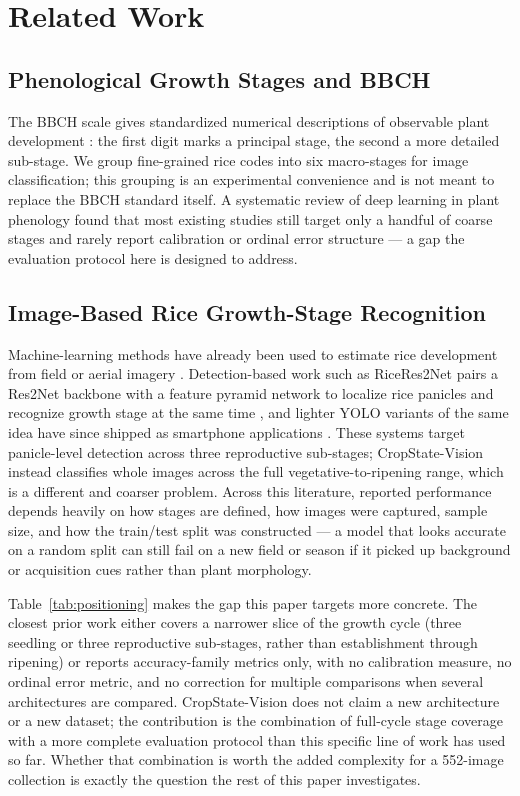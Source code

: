 \documentclass{llncs}
\begin{document}
\section{Related Work}

\subsection{Phenological Growth Stages and BBCH}

The BBCH scale gives standardized numerical descriptions of observable plant development \cite{meier2001bbch,lancashire1991uniform}: the first digit marks a principal stage, the second a more detailed sub-stage. We group fine-grained rice codes into six macro-stages for image classification; this grouping is an experimental convenience and is not meant to replace the BBCH standard itself. A systematic review of deep learning in plant phenology found that most existing studies still target only a handful of coarse stages and rarely report calibration or ordinal error structure \cite{katal2022deep} — a gap the evaluation protocol here is designed to address.

\subsection{Image-Based Rice Growth-Stage Recognition}

Machine-learning methods have already been used to estimate rice development from field or aerial imagery \cite{tan2022machine}. Detection-based work such as RiceRes2Net pairs a Res2Net backbone with a feature pyramid network to localize rice panicles and recognize growth stage at the same time \cite{tan2023ricepanicle}, and lighter YOLO variants of the same idea have since shipped as smartphone applications \cite{zheng2025android}. These systems target panicle-level detection across three reproductive sub-stages; CropState-Vision instead classifies whole images across the full vegetative-to-ripening range, which is a different and coarser problem. Across this literature, reported performance depends heavily on how stages are defined, how images were captured, sample size, and how the train/test split was constructed — a model that looks accurate on a random split can still fail on a new field or season if it picked up background or acquisition cues rather than plant morphology.

Table~\ref{tab:positioning} makes the gap this paper targets more concrete. The closest prior work either covers a narrower slice of the growth cycle (three seedling or three reproductive sub-stages, rather than establishment through ripening) or reports accuracy-family metrics only, with no calibration measure, no ordinal error metric, and no correction for multiple comparisons when several architectures are compared. CropState-Vision does not claim a new architecture or a new dataset; the contribution is the combination of full-cycle stage coverage with a more complete evaluation protocol than this specific line of work has used so far. Whether that combination is worth the added complexity for a 552-image collection is exactly the question the rest of this paper investigates.
\end{document}
